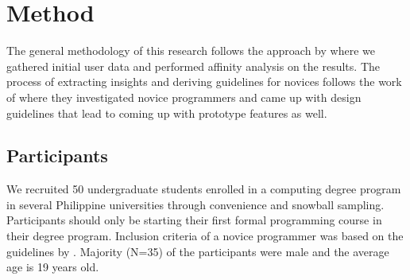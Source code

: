 \documentclass{sigchi}
\begin{document}

\section{Method}
The general methodology of this research follows the approach by \cite{peffers2007design} where we gathered initial user data and performed affinity analysis on the results. The process of extracting insights and deriving guidelines for novices follows the work of \cite{beyer1999contextual, holtzblatt2005rapid, good2017programming} where they investigated novice programmers and came up with design guidelines that lead to coming up with prototype features as well. %

\subsection{Participants}
We recruited 50 undergraduate students enrolled in a computing degree program in several Philippine universities through convenience and snowball sampling. Participants should only be starting their first formal programming course in their degree program. Inclusion criteria of a novice programmer was based on the guidelines by \cite{teague2014longitudinal}. Majority (N=35) of the participants were male and the average age is 19 years old.
\end{document}
